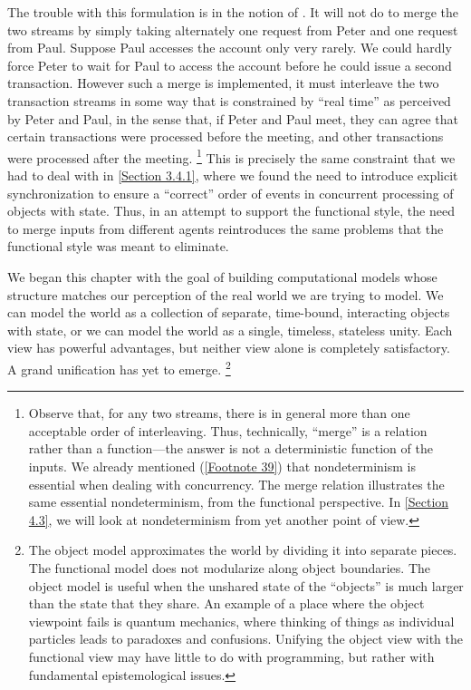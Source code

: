 The trouble with this formulation is in the notion of .
It will not do to merge the two streams by simply taking alternately one request from Peter and one request from Paul.
Suppose Paul accesses the account only very rarely.
We could hardly force Peter to wait for Paul to access the account before he could issue a second transaction.
However such a merge is implemented, it must interleave the two transaction streams in some way that is constrained by “real time” as perceived by Peter and Paul, in the sense that, if Peter and Paul meet, they can agree that certain transactions were processed before the meeting, and other transactions were processed after the meeting.%
\footnote{
	Observe that, for any two streams, there is in general more than one acceptable order of interleaving.
	Thus, technically, “merge” is a relation rather than a function---the answer is not a deterministic function of the inputs.
	We already mentioned (\cref{Footnote 39}) that nondeterminism is essential when dealing with concurrency.
	The merge relation illustrates the same essential nondeterminism, from the functional perspective.
	In \cref{Section 4.3}, we will look at nondeterminism from yet another point of view.
}
This is precisely the same constraint that we had to deal with in \cref{Section 3.4.1}, where we found the need to introduce explicit synchronization to ensure a “correct” order of events in concurrent processing of objects with state.
Thus, in an attempt to support the functional style, the need to merge inputs from different agents reintroduces the same problems that the functional style was meant to eliminate.

We began this chapter with the goal of building computational models whose structure matches our perception of the real world we are trying to model.
We can model the world as a collection of separate, time-bound, interacting objects with state, or we can model the world as a single, timeless, stateless unity.
Each view has powerful advantages, but neither view alone is completely satisfactory.
A grand unification has yet to emerge.%
\footnote{
	The object model approximates the world by dividing it into separate pieces.
	The functional model does not modularize along object boundaries.
	The object model is useful when the unshared state of the “objects” is much larger than the state that they share.
	An example of a place where the object viewpoint fails is quantum mechanics, where thinking of things as individual particles leads to paradoxes and confusions.
	Unifying the object view with the functional view may have little to do with programming, but rather with fundamental epistemological issues.
}
